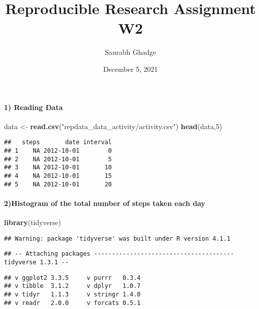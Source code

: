 \documentclass[]{article}
\title{Reproducible Research Assignment W2}
\author{Saurabh Ghadge}
\date{December 5, 2021}
\newenvironment{Shaded}{\begin{snugshade}}{\end{snugshade}}
\newcommand{\KeywordTok}[1]{\textcolor[rgb]{0.13,0.29,0.53}{\textbf{#1}}}
\newcommand{\DecValTok}[1]{\textcolor[rgb]{0.00,0.00,0.81}{#1}}
\newcommand{\StringTok}[1]{\textcolor[rgb]{0.31,0.60,0.02}{#1}}
\newcommand{\NormalTok}[1]{#1}
\let\oldparagraph\paragraph
\renewcommand{\paragraph}[1]{\oldparagraph{#1}\mbox{}}
\begin{document}
\maketitle

\paragraph{1) Reading Data}\label{reading-data}

\begin{Shaded}
\begin{Highlighting}[]
\NormalTok{data <-}\StringTok{ }\KeywordTok{read.csv}\NormalTok{(}\StringTok{"repdata_data_activity/activity.csv"}\NormalTok{)}
\KeywordTok{head}\NormalTok{(data,}\DecValTok{5}\NormalTok{)}
\end{Highlighting}
\end{Shaded}

\begin{verbatim}
##   steps       date interval
## 1    NA 2012-10-01        0
## 2    NA 2012-10-01        5
## 3    NA 2012-10-01       10
## 4    NA 2012-10-01       15
## 5    NA 2012-10-01       20
\end{verbatim}

\paragraph{2)Histogram of the total number of steps taken each
day}\label{histogram-of-the-total-number-of-steps-taken-each-day}

\begin{Shaded}
\begin{Highlighting}[]
\KeywordTok{library}\NormalTok{(tidyverse)}
\end{Highlighting}
\end{Shaded}

\begin{verbatim}
## Warning: package 'tidyverse' was built under R version 4.1.1
\end{verbatim}

\begin{verbatim}
## -- Attaching packages --------------------------------------- tidyverse 1.3.1 --
\end{verbatim}

\begin{verbatim}
## v ggplot2 3.3.5     v purrr   0.3.4
## v tibble  3.1.2     v dplyr   1.0.7
## v tidyr   1.1.3     v stringr 1.4.0
## v readr   2.0.0     v forcats 0.5.1
\end{verbatim}
\end{document}
